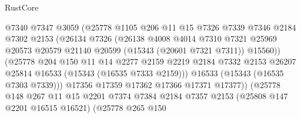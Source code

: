 \begin{lexlean}{RustCore}
\begin{coremodule}
                              @7340
                              @7347
                              @3059
                              (@25778
                                @1105
                                @206
                                @11
                                @15
                                @7326
                                @7339
                                @7346
                                @2184
                                @7302
                                @2153
                                (@26134
                                  @7326
                                  (@26138
                                    @4008
                                    @4014
                                    @7310
                                    @7321
                                    @25969
                                    @20573
                                    @20579
                                    @21140
                                    @20599
                                    (@15343 (@20601 @7321 @7311))
                                    @15560))
                                (@25778
                                  @204
                                  @150
                                  @11
                                  @14
                                  @2277
                                  @2159
                                  @2219
                                  @2184
                                  @7332
                                  @2153
                                  @26207
                                  @25814
                                  @16533
                                  (@15343 (@16535 @7333 @2159)))
                                @16533
                                (@15343 (@16535 @7303 @7339)))
                              @17356
                              @17359
                              @17362
                              @17366
                              @17371
                              @17377))
                          (@25778
                            @148
                            @267
                            @11
                            @15
                            @2201
                            @7374
                            @7384
                            @2184
                            @7357
                            @2153
                            (@25808 @147 @2201 @16515 @16521)
                            (@25778
                              @265
                              @150

\end{coremodule}
\end{lexlean}
